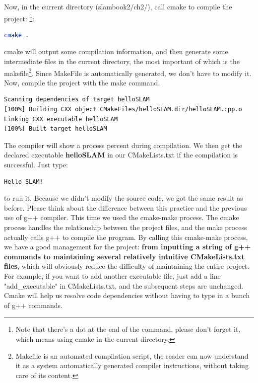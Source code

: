 Now, in the current directory (slambook2/ch2/), call cmake to compile the project: \footnote{Note that there's a dot at the end of the command, please don't forget it, which means using cmake in the current directory. }:
\begin{lstlisting}[language=sh,caption=Terminal input]
cmake .
\end{lstlisting}
cmake will output some compilation information, and then generate some intermediate files in the current directory, the most important of which is the makefile\footnote{Makefile is an automated compilation script, the reader can now understand it as a system automatically generated compiler instructions, without taking care of its content. }. Since MakeFile is automatically generated, we don't have to modify it. Now, compile the project with the make command.
\begin{lstlisting}[language=sh,caption=Terminal input]
% make
Scanning dependencies of target helloSLAM
[100%] Building CXX object CMakeFiles/helloSLAM.dir/helloSLAM.cpp.o
Linking CXX executable helloSLAM
[100%] Built target helloSLAM
\end{lstlisting}
The compiler will show a process percent during compilation. We then get the declared executable \textbf{helloSLAM} in our CMakeLists.txt if the compilation is successful. Just type:
\begin{lstlisting}[language=sh,caption=Terminal Input]
% ./helloSLAM
Hello SLAM!
\end{lstlisting}
to run it. Because we didn't modify the source code, we got the same result as before. Please think about the difference between this practice and the previous use of g++ compiler. This time we used the cmake-make process. The cmake process handles the relationship between the project files, and the make process actually calls g++ to compile the program. By calling this cmake-make process, we have a good management for the project: \textbf{from inputting a string of g++ commands to maintaining several relatively intuitive CMakeLists.txt files}, which will obviously reduce the difficulty of maintaining the entire project. For example, if you want to add another executable file, just add a line "add\_executable" in CMakeLists.txt, and the subsequent steps are unchanged. Cmake will help us resolve code dependencies without having to type in a bunch of g++ commands.


